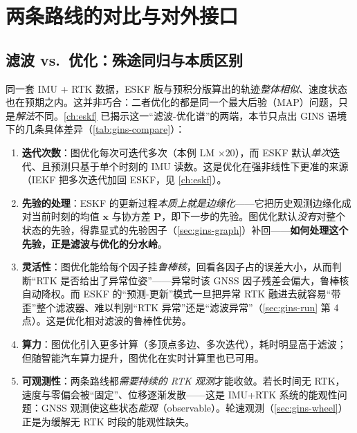 \section{两条路线的对比与对外接口}
\label{sec:gins-compare}

\subsection{滤波 vs.\ 优化：殊途同归与本质区别}
\label{sec:gins-filter-vs-opt}

同一套 IMU + RTK 数据，ESKF 版与预积分版算出的轨迹\emph{整体相似}、速度状态也在预期之内\cite{gao2023slamad}。这并非巧合：二者优化的都是同一个最大后验（MAP）问题，只是\emph{解法}不同。\cref{ch:eskf} 已揭示这一“滤波-优化谱”的两端，本节只点出 GINS 语境下的几条具体差异（\cref{tab:gins-compare}）：

\begin{enumerate}
  \item \textbf{迭代次数}：图优化每次可迭代多次（本例 LM $\times 20$），而 ESKF 默认\emph{单次}迭代、且预测只基于单个时刻的 IMU 读数\cite{gao2023slamad}。这是优化在强非线性下更准的来源（IEKF 把多次迭代加回 ESKF，见 \cref{ch:eskf}）。
  \item \textbf{先验的处理}：ESKF 的更新过程\emph{本质上就是边缘化}——它把历史观测边缘化成对当前时刻的均值 $\mathbf{x}$ 与协方差 $\mathbf{P}$，即下一步的先验\cite{gao2023slamad}。图优化默认\emph{没有}对整个状态的先验，得靠显式的先验因子（\cref{sec:gins-graph}）补回——\textbf{如何处理这个先验，正是滤波与优化的分水岭}。
  \item \textbf{灵活性}：图优化能给每个因子挂\emph{鲁棒核}，回看各因子占的误差大小，从而判断“RTK 是否给出了异常位姿”——异常时该 GNSS 因子残差会偏大，鲁棒核自动降权\cite{gao2023slamad}。而 ESKF 的“预测-更新”模式一旦把异常 RTK 融进去就容易“带歪”整个滤波器、难以判别“RTK 异常”还是“滤波异常”（\cref{sec:gins-run} 第 4 点）。这是优化相对滤波的鲁棒性优势。
  \item \textbf{算力}：图优化引入更多计算（多顶点多边、多次迭代），耗时明显高于滤波\cite{gao2023slamad}；但随智能汽车算力提升，图优化在实时计算里也已可用。
  \item \textbf{可观测性}：两条路线都\emph{需要持续的 RTK 观测}才能收敛。若长时间无 RTK，速度与零偏会被“固定”、位移逐渐发散——这是 IMU+RTK 系统的能观性问题：GNSS 观测使这些状态\emph{能观}（observable）\cite{gao2023slamad}。轮速观测（\cref{sec:gins-wheel}）正是为缓解无 RTK 时段的能观性缺失。
\end{enumerate}

